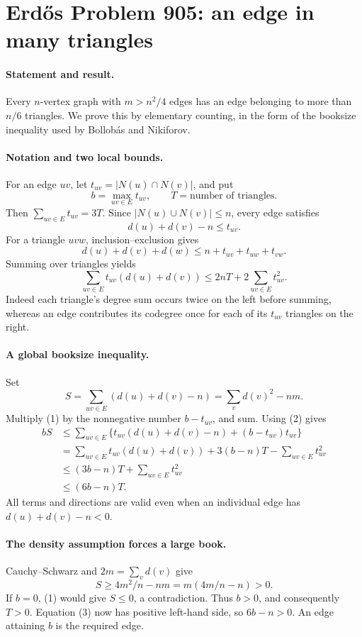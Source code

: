 \section*{Erd\H{o}s Problem 905: an edge in many triangles}

\paragraph{Statement and result.}
Every \(n\)-vertex graph with \(m>n^2/4\) edges has an
edge belonging to more than \(n/6\) triangles.
We prove this by elementary counting, in the form of
the booksize inequality used by Bollob\'as and Nikiforov.

\paragraph{Notation and two local bounds.}
For an edge \(uv\), let
\(t_{uv}=|N(u)\cap N(v)|\), and put
\[
 b=\max_{uv\in E}t_{uv},\qquad T=\text{number of triangles}.
\]
Then \(\sum_{uv\in E}t_{uv}=3T\).
Since \(|N(u)\cup N(v)|\leq n\), every edge satisfies
\[
 d(u)+d(v)-n\leq t_{uv}.
\tag{1}
\]
For a triangle \(uvw\), inclusion--exclusion gives
\[
 d(u)+d(v)+d(w)
 \leq n+t_{uv}+t_{uw}+t_{vw}.
\]
Summing over triangles yields
\[
 \sum_{uv\in E}t_{uv}(d(u)+d(v))
 \leq2nT+2\sum_{uv\in E}t_{uv}^2.
\tag{2}
\]
Indeed each triangle's degree sum occurs twice on the
left before summing, whereas an edge contributes its
codegree once for each of its \(t_{uv}\) triangles on
the right.

\paragraph{A global booksize inequality.}
Set
\[
 S=\sum_{uv\in E}(d(u)+d(v)-n)
   =\sum_vd(v)^2-nm.
\]
Multiply (1) by the nonnegative number \(b-t_{uv}\),
and sum. Using (2) gives
\[
 \begin{split}
 bS
 &\leq\sum_{uv\in E}
       \{t_{uv}(d(u)+d(v)-n)+(b-t_{uv})t_{uv}\}\\
 &=\sum_{uv\in E}t_{uv}(d(u)+d(v))
       +3(b-n)T-\sum_{uv\in E}t_{uv}^2\\
 &\leq(3b-n)T+\sum_{uv\in E}t_{uv}^2\\
 &\leq(6b-n)T.
 \end{split}
\tag{3}
\]
All terms and directions are valid even when an individual
edge has \(d(u)+d(v)-n<0\).

\paragraph{The density assumption forces a large book.}
Cauchy--Schwarz and \(2m=\sum_vd(v)\) give
\[
 S\geq4m^2/n-nm=m(4m/n-n)>0.
\]
If \(b=0\), (1) would give \(S\leq0\), a contradiction.
Thus \(b>0\), and consequently \(T>0\).
Equation (3) now has positive left-hand side, so
\(6b-n>0\). An edge attaining \(b\) is the required edge.

